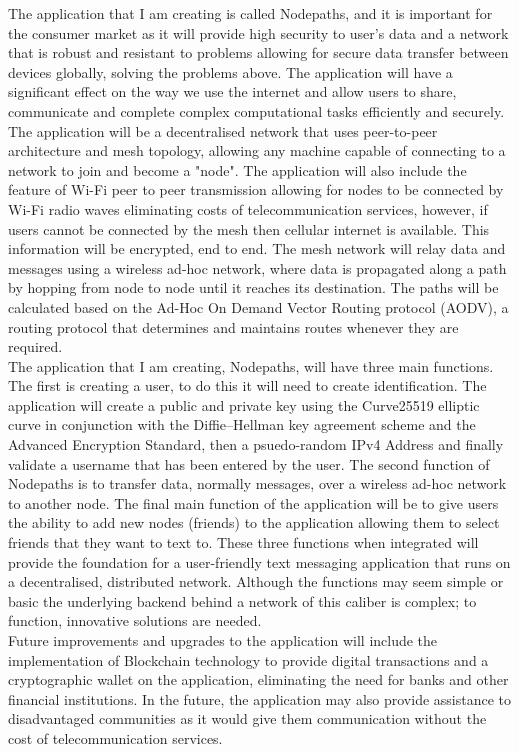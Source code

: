 \documentclass[a4paper, titlepage]{article}
\begin{document}
The application that I am creating is called Nodepaths, and it is important for the consumer market as it will provide high security to user's data and a network that is robust and resistant to problems allowing for secure data transfer between devices globally, solving the problems above. The application will have a significant effect on the way we use the internet and allow users to share, communicate and complete complex computational tasks efficiently and securely. The application will be a decentralised network that uses peer-to-peer architecture and mesh topology, allowing any machine capable of connecting to a network to join and become a "node". The application will also include the feature of Wi-Fi peer to peer transmission allowing for nodes to be connected by Wi-Fi radio waves eliminating costs of telecommunication services, however, if users cannot be connected by the mesh then cellular internet is available. This information will be encrypted, end to end. The mesh network will relay data and messages using a wireless ad-hoc network, where data is propagated along a path by hopping from node to node until it reaches its destination. The paths will be calculated based on the Ad-Hoc On Demand Vector Routing protocol (AODV), a routing protocol that determines and maintains routes whenever they are required. \\

The application that I am creating, Nodepaths, will have three main functions. The first is creating a user, to do this it will need to create identification. The application will create a public and private key using the Curve25519 elliptic curve in conjunction with the Diffie–Hellman key agreement scheme and the Advanced Encryption Standard, then a psuedo-random IPv4 Address and finally validate a username that has been entered by the user. The second function of Nodepaths is to transfer data, normally messages, over a wireless ad-hoc network to another node. The final main function of the application will be to give users the ability to add new nodes (friends) to the application allowing them to select friends that they want to text to. These three functions when integrated will provide the foundation for a user-friendly text messaging application that runs on a decentralised, distributed network. Although the functions may seem simple or basic the underlying backend behind a network of this caliber is complex; to function, innovative solutions are needed. \\

Future improvements and upgrades to the application will include the implementation of Blockchain technology to provide digital transactions and a cryptographic wallet on the application, eliminating the need for banks and other financial institutions. In the future, the application may also provide assistance to disadvantaged communities as it would give them communication without the cost of telecommunication services.
\end{document}
